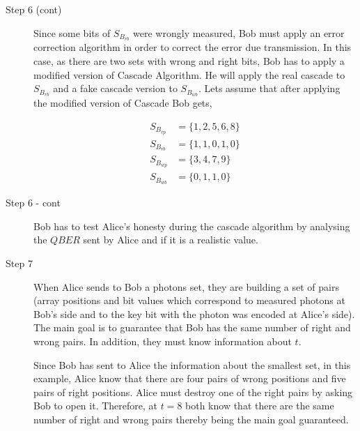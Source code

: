 
\large
\vspace*{0mm}

\begin{description}
  \item[Step 6 (cont)] Since some bits of $S_{B_{rb}}$ were wrongly measured, Bob must apply an error correction algorithm in order to correct the error due transmission. In this case, as there are two sets with wrong and right bits, Bob has to apply a modified version of Cascade Algorithm. He will apply the real cascade to $S_{B_{rb}}$ and a fake cascade version to $S_{B_{wb}}$.
      Lets assume that after applying the modified version of Cascade Bob gets,

      \begin{align*}
        S_{B_{rp}} & = \{1,2,5,6,8 \} \\
        S_{B_{rb}} & = \{1,1,0,1,0 \} \\
        S_{B_{wp}} & = \{3,4,7,9 \} \\
        S_{B_{wb}} & = \{0,1,1,0 \}
      \end{align*}
\end{description}




\large
\vspace{0.4cm}
\begin{description}
  \item[Step 6 - cont] Bob has to test Alice's honesty during the cascade algorithm by analysing the $QBER$ sent by Alice and if it is a realistic value.

  \item[Step 7] When Alice sends to Bob a photons set, they are building a set of pairs (array positions and bit values which correspond to measured photons at Bob's side and to the key bit with the photon was encoded at Alice's side).
      The main goal is to guarantee that Bob has the same number of right and wrong pairs. In addition, they must know information about $t$.

       Since Bob has sent to Alice the information about the smallest set, in this example, Alice know that there are four pairs of wrong positions and five pairs of right positions. Alice must destroy one of the right pairs by asking Bob to open it. Therefore, at $t=8$ both know that there are the same number of right and wrong pairs thereby being the main goal guaranteed.

\end{description}

